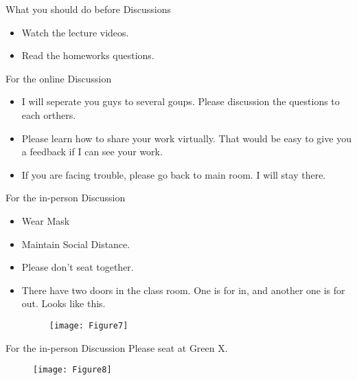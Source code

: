\documentclass{beamer}
\begin{document}
\begin{frame}{What you should do before Discussions}
\begin{itemize}
	\item Watch the lecture videos.
	\item Read the homeworks questions.
\end{itemize}

\end{frame}

\begin{frame}{For the online Discussion}
\begin{itemize}
\item I will seperate you guys to several goups. Please discussion the questions to each orthers.
\item Please learn how to share your work virtually. That would be easy to give you a feedback if I can see your work.
\item  If you are facing trouble, please go back to main room. I will stay there.
\end{itemize}
\end{frame}

\begin{frame}{For the in-person Discussion}
	\begin{itemize}
		\item Wear Mask
		\item Maintain Social Distance.
		\item Please don't seat together.
		\item There have two doors in the class room. One is for in, and another one is for out. Looks like this.
			\begin{figure}
			\centering
			\texttt{[image: Figure7]}
		\end{figure}
		\end{itemize}
\end{frame}
\begin{frame}{For the in-person Discussion}
	Please seat at Green X.
\begin{figure}
	\centering
	\texttt{[image: Figure8]}
\end{figure}
\end{frame}
\end{document}
